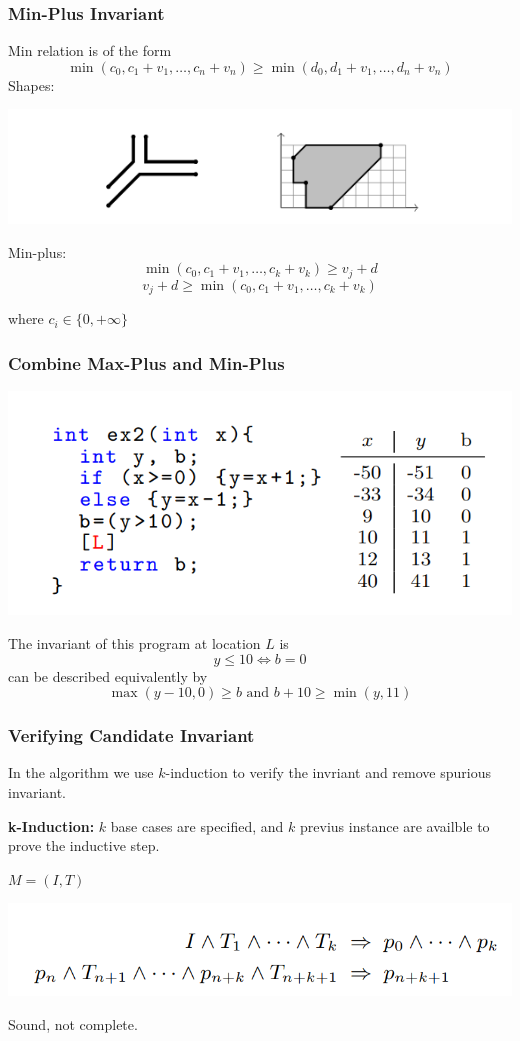 \documentclass[11pt]{beamer}
\begin{document}
\begin{frame}\frametitle{Min-Plus Invariant}
Min relation is of the form
\[\min(c_0, c_1 + v_1, \ldots, c_n + v_n) \ge \min(d_0, d_1 + v_1, \ldots, d_n + v_n)\]
Shapes:
\begin{center}
\includegraphics[scale=0.4]{5.png}

\end{center}
Min-plus:
\[\min(c_0, c_1 + v_1, \ldots, c_k + v_k) \ge v_j + d\]
\[v_j + d \ge \min(c_0,c_1 + v_1, \ldots, c_k + v_k)\]

where $c_i \in \{0, +\infty\}$

\end{frame}

\begin{frame}\frametitle{Combine Max-Plus and Min-Plus}
\begin{center}
\includegraphics[scale=0.35]{11.png}
\end{center}
The invariant of this program at location $L$ is 
\[y\le 10 \Leftrightarrow b = 0\]
can be described equivalently by 
\[\max(y - 10, 0) \ge b \text{ and } b + 10 \ge\min(y, 11)\]
\end{frame}

\begin{frame}\frametitle{Verifying Candidate Invariant}
In the algorithm we use $k$-induction to verify the invriant and remove spurious invariant.

\textbf{k-Induction:} $k$ base cases are specified, and $k$ previus instance are availble to prove the inductive step.

$M = (I,T)$
\begin{center}
\includegraphics[scale=0.35]{7.png}
\end{center}
Sound, not complete.



\end{frame}
\end{document}
